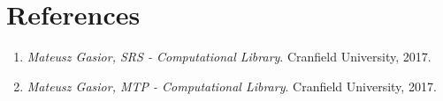 \section{References} \label{s:introduction:references}
	\begin{comment}
		List all of the applicable reference documents. The references are separated into “external” references
		that are imposed external to the project and “internal” references that are imposed from within to the
		project. This may also be at the end of the document.
	\end{comment}
	\begin{enumerate}
		\item \emph{Mateusz Gasior, \gls{SRS} - Computational Library}. Cranfield University, 2017.
		\item \emph{Mateusz Gasior, \gls{MTP} - Computational Library}. Cranfield University, 2017. 
	\end{enumerate}